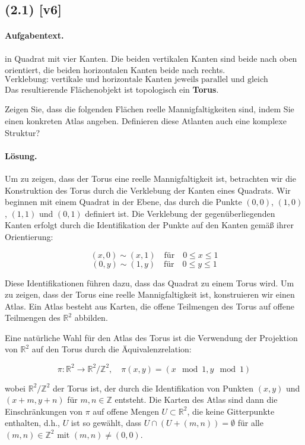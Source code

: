\documentclass[11pt,a4paper]{article}
\begin{document}
\subsection*{(2.1) [v6]}
\paragraph{Aufgabentext.}
in Quadrat mit vier Kanten. 
Die beiden vertikalen Kanten sind beide nach oben orientiert, 
die beiden horizontalen Kanten beide nach rechts.  
\[
\text{Verklebung: vertikale und horizontale Kanten jeweils parallel und gleich orientiert.}
\]
Das resultierende Flächenobjekt ist topologisch ein \textbf{Torus}.

Zeigen Sie, dass die folgenden Flächen reelle Mannigfaltigkeiten sind, indem Sie einen konkreten Atlas angeben. Definieren diese Atlanten auch eine komplexe Struktur?

\paragraph{Lösung.}
Um zu zeigen, dass der Torus eine reelle Mannigfaltigkeit ist, betrachten wir die Konstruktion des Torus durch die Verklebung der Kanten eines Quadrats. Wir beginnen mit einem Quadrat in der Ebene, das durch die Punkte \( (0,0) \), \( (1,0) \), \( (1,1) \) und \( (0,1) \) definiert ist. Die Verklebung der gegenüberliegenden Kanten erfolgt durch die Identifikation der Punkte auf den Kanten gemäß ihrer Orientierung:

\[
(x,0) \sim (x,1) \quad \text{für} \quad 0 \leq x \leq 1
\]
\[
(0,y) \sim (1,y) \quad \text{für} \quad 0 \leq y \leq 1
\]

Diese Identifikationen führen dazu, dass das Quadrat zu einem Torus wird. Um zu zeigen, dass der Torus eine reelle Mannigfaltigkeit ist, konstruieren wir einen Atlas. Ein Atlas besteht aus Karten, die offene Teilmengen des Torus auf offene Teilmengen des \(\mathbb{R}^2\) abbilden.

Eine natürliche Wahl für den Atlas des Torus ist die Verwendung der Projektion von \(\mathbb{R}^2\) auf den Torus durch die Äquivalenzrelation:

\[
\pi: \mathbb{R}^2 \to \mathbb{R}^2 / \mathbb{Z}^2, \quad \pi(x,y) = (x \mod 1, y \mod 1)
\]

wobei \(\mathbb{R}^2 / \mathbb{Z}^2\) der Torus ist, der durch die Identifikation von Punkten \((x,y)\) und \((x+m, y+n)\) für \(m, n \in \mathbb{Z}\) entsteht. Die Karten des Atlas sind dann die Einschränkungen von \(\pi\) auf offene Mengen \(U \subset \mathbb{R}^2\), die keine Gitterpunkte enthalten, d.h., \(U\) ist so gewählt, dass \(U \cap (U + (m,n)) = \emptyset\) für alle \((m,n) \in \mathbb{Z}^2\) mit \((m,n) \neq (0,0)\).
\end{document}
